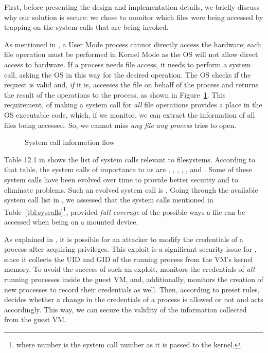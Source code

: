 \par First, before presenting the design and implementation details, we briefly discuss why our solution is secure: we chose to monitor which files were being accessed by trapping on the system calls that are being invoked. 

\par As mentioned in \cite{linuxkernel}, a User Mode process cannot directly access the hardware; each file operation must be performed in Kernel Mode as the \ac{OS} will not allow direct access to hardware. If a process needs file access, it needs to perform a system call, asking the \ac{OS} in this way for the desired operation. The \ac{OS} checks if the request is valid and, \emph{if} it is, accesses the file on behalf of the process and returns the result of the operations to the process, as shown in Figure~\ref{fig:syscall}. This requirement, of making a system call for \emph{all} file operations provides a place in the \ac{OS} executable code, which, if we monitor, we can extract the information of all files being accessed. So, we cannot miss \emph{any file any process} tries to open.

\begin{figure}[ht]
	\centering
	
	\caption{System call information flow}
	\label{fig:syscall}
\end{figure}

\par Table 12.1 in \cite{linuxkernel} shows the list of system calls relevant to filesystems. According to that table, the system calls of importance to us are , , , , , and . Some of these system calls have been evolved over time to provide better security and to eliminate problems. Such an evolved system call is . Going through the available system call list in , we assessed that the system calls mentioned in Table~\ref{tbl:syscalls}\footnote{where number is the system call number as it is passed to the kernel.}, provided \emph{full coverage} of the possible ways a file can be accessed when being on a mounted device. 

\par As explained in \cite{perla2010guide}, it is possible for an attacker to modify the credentials of a process after acquiring  privileges. This exploit is a significant security issue for , since it collects the \ac{UID} and \ac{GID} of the running process from the \ac{VM}'s kernel memory. To avoid the success of such an exploit,  monitors the credentials of \emph{all} running processes inside the guest \ac{VM}, and, additionally, monitors the creation of new processes to record their credentials as well. Then, according to preset rules,  decides whether a change in the credentials of a process is allowed or not and acts accordingly. This way, we can secure the validity of the information collected from the guest \ac{VM}.


